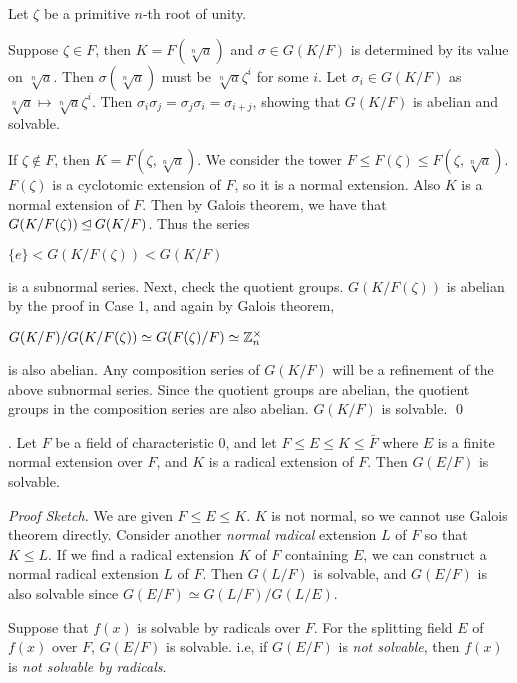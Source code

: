 \pf Let \(\zeta\) be a primitive \(n\)-th root of unity.

 Suppose \(\zeta \in F\), then \(K = F(\sqrt[n]{a})\) and \(\sigma \in G(K/F)\) is determined by its value on \(\sqrt[n]{a}\). Then \(\sigma(\sqrt[n]{a})\) must be \(\sqrt[n]{a}\zeta^i\) for some \(i\). Let \(\sigma_i \in G(K/F)\) as \(\sqrt[n]{a} \mapsto \sqrt[n]{a}\zeta^i\). Then \(\sigma_i \sigma_j = \sigma_j \sigma_i = \sigma_{i+j}\), showing that \(G(K/F)\) is abelian and solvable.

 If \(\zeta \notin F\), then \(K = F(\zeta, \sqrt[n]{a})\). We consider the tower \(F \leq F(\zeta) \leq F(\zeta, \sqrt[n]{a})\). \(F(\zeta)\) is a cyclotomic extension of \(F\), so it is a normal extension. Also \(K\) is a normal extension of \(F\). Then by Galois theorem, we have that \(G(K/F(\zeta)) \unlhd G(K/F)\). Thus the series
\begin{center}
    \(\{e\} < G(K/F(\zeta)) < G(K/F)\)
\end{center}
is a subnormal series. Next, check the quotient groups. \(G(K/F(\zeta))\) is abelian by the proof in Case 1, and again by Galois theorem,
\begin{center}
    \(G(K/F) / G(K/F(\zeta)) \simeq G(F(\zeta)/F) \simeq \mathbb{Z}_n^\times\)
\end{center}
is also abelian. Any composition series of \(G(K/F)\) will be a refinement of the above subnormal series. Since the quotient groups are abelian, the quotient groups in the composition series are also abelian. \(G(K/F)\) is solvable. \qed

\thm. Let \(F\) be a field of characteristic \(0\), and let \(F \leq E \leq K \leq \bar{F}\) where \(E\) is a finite normal extension over \(F\), and \(K\) is a radical extension of \(F\). Then \(G(E/F)\) is solvable.

\textit{Proof Sketch.} We are given \(F \leq E \leq K\). \(K\) is not normal, so we cannot use Galois theorem directly. Consider another \textit{normal radical} extension \(L\) of \(F\) so that \(K \leq L\). If we find a radical extension \(K\) of \(F\) containing \(E\), we can construct a normal radical extension \(L\) of \(F\). Then \(G(L/F)\) is solvable, and \(G(E/F)\) is also solvable since \(G(E/F) \simeq G(L/F)/G(L/E)\).

\rmk Suppose that \(f(x)\) is solvable by radicals over \(F\). For the splitting field \(E\) of \(f(x)\) over \(F\), \(G(E/F)\) is solvable. i.e, if \(G(E/F)\) is \textit{not solvable}, then \(f(x)\) is \textit{not solvable by radicals}.

